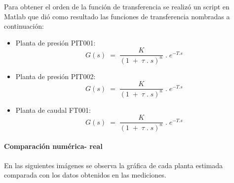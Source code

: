 Para obtener el orden de la función de transferencia se realizó un script en Matlab que dió como resultado las funciones de transferencia nombradas a continuación:
\begin{itemize}
	\item Planta de presión PIT001:
	\begin{equation}
	 G(s)\;=\;\frac K{(1\;+\;\tau\;.\;s)^n}\;.\;e^{-T.s}
	\end{equation}
	\item Planta de presión PIT002: 	
	\begin{equation}
		G(s)\;=\;\frac K{(1\;+\;\tau\;.\;s)^n}\;.\;e^{-T.s}
	\end{equation}
	\item Planta de caudal FT001:
		\begin{equation}
		G(s)\;=\;\frac K{(1\;+\;\tau\;.\;s)^n}\;.\;e^{-T.s}
	\end{equation}
\end{itemize}

\paragraph{Comparación numérica- real}
En las siguientes imágenes se observa la gráfica de cada planta estimada comparada con los datos obtenidos en las mediciones.

